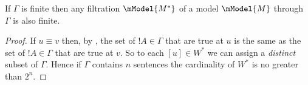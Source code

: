 \documentclass[../../../include/open-logic-section]{subfiles}
\begin{document}


\begin{prop}
  If $\Gamma$ is finite then any filtration $\mModel{M^*}$ of a model
  $\mModel{M}$ through $\Gamma$ is also finite.
\end{prop}

\begin{proof}
  If $u \equiv v$ then, by , the set of
  $!A \in \Gamma$ that are true at $u$ is the same as the set of
  $!A \in \Gamma$ that are true at $v$. So to each $[u] \in W^*$
  we can assign a \emph{distinct} subset of $\Gamma$. Hence if
  $\Gamma$ contains $n$ sentences the cardinality of $W^*$ is no
  greater than $2^n$.
\end{proof}
\end{document}
